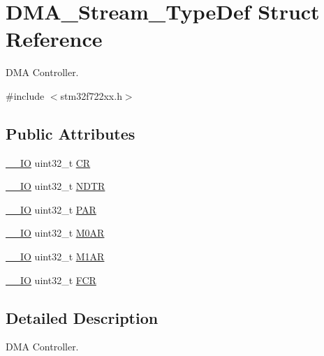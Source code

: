 \hypertarget{struct_d_m_a___stream___type_def}{}\section{D\+M\+A\+\_\+\+Stream\+\_\+\+Type\+Def Struct Reference}
\label{struct_d_m_a___stream___type_def}


D\+MA Controller.  




{\ttfamily \#include $<$stm32f722xx.\+h$>$}

\subsection*{Public Attributes}
\begin{DoxyCompactItemize}
\item 
\mbox{\hyperlink{core__sc300_8h_aec43007d9998a0a0e01faede4133d6be}{\+\_\+\+\_\+\+IO}} uint32\+\_\+t \mbox{\hyperlink{struct_d_m_a___stream___type_def_af893adc5e821b15d813237b2bfe4378b}{CR}}
\item 
\mbox{\hyperlink{core__sc300_8h_aec43007d9998a0a0e01faede4133d6be}{\+\_\+\+\_\+\+IO}} uint32\+\_\+t \mbox{\hyperlink{struct_d_m_a___stream___type_def_a2cc2a52628182f9e79ab1e49bb78a1eb}{N\+D\+TR}}
\item 
\mbox{\hyperlink{core__sc300_8h_aec43007d9998a0a0e01faede4133d6be}{\+\_\+\+\_\+\+IO}} uint32\+\_\+t \mbox{\hyperlink{struct_d_m_a___stream___type_def_adbeac1d47cb85ab52dac71d520273947}{P\+AR}}
\item 
\mbox{\hyperlink{core__sc300_8h_aec43007d9998a0a0e01faede4133d6be}{\+\_\+\+\_\+\+IO}} uint32\+\_\+t \mbox{\hyperlink{struct_d_m_a___stream___type_def_a965da718db7d0303bff185d367d96fd6}{M0\+AR}}
\item 
\mbox{\hyperlink{core__sc300_8h_aec43007d9998a0a0e01faede4133d6be}{\+\_\+\+\_\+\+IO}} uint32\+\_\+t \mbox{\hyperlink{struct_d_m_a___stream___type_def_a142ca5a1145ba9cf4cfa557655af1c13}{M1\+AR}}
\item 
\mbox{\hyperlink{core__sc300_8h_aec43007d9998a0a0e01faede4133d6be}{\+\_\+\+\_\+\+IO}} uint32\+\_\+t \mbox{\hyperlink{struct_d_m_a___stream___type_def_aad3d78ab35e7af48951be5be53392f9f}{F\+CR}}
\end{DoxyCompactItemize}


\subsection{Detailed Description}
D\+MA Controller. 

